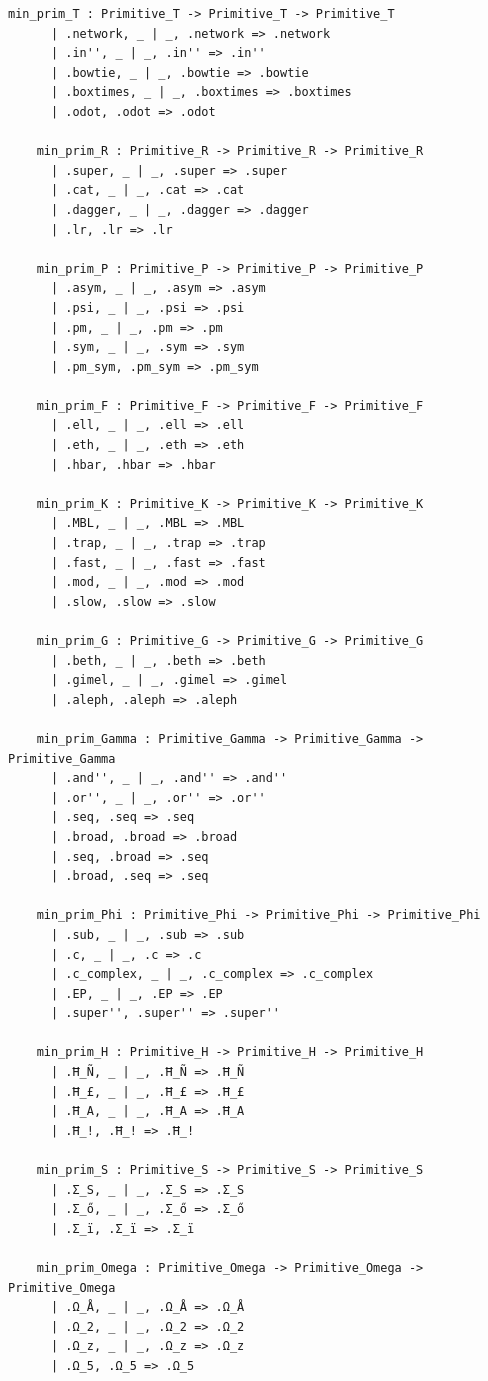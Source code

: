 \documentclass[12pt,a4paper]{article}
\begin{document}
\begin{lstlisting}[language=lean4]
    min_prim_T : Primitive_T -> Primitive_T -> Primitive_T
      | .network, _ | _, .network => .network
      | .in'', _ | _, .in'' => .in''
      | .bowtie, _ | _, .bowtie => .bowtie
      | .boxtimes, _ | _, .boxtimes => .boxtimes
      | .odot, .odot => .odot

    min_prim_R : Primitive_R -> Primitive_R -> Primitive_R
      | .super, _ | _, .super => .super
      | .cat, _ | _, .cat => .cat
      | .dagger, _ | _, .dagger => .dagger
      | .lr, .lr => .lr

    min_prim_P : Primitive_P -> Primitive_P -> Primitive_P
      | .asym, _ | _, .asym => .asym
      | .psi, _ | _, .psi => .psi
      | .pm, _ | _, .pm => .pm
      | .sym, _ | _, .sym => .sym
      | .pm_sym, .pm_sym => .pm_sym

    min_prim_F : Primitive_F -> Primitive_F -> Primitive_F
      | .ell, _ | _, .ell => .ell
      | .eth, _ | _, .eth => .eth
      | .hbar, .hbar => .hbar

    min_prim_K : Primitive_K -> Primitive_K -> Primitive_K
      | .MBL, _ | _, .MBL => .MBL
      | .trap, _ | _, .trap => .trap
      | .fast, _ | _, .fast => .fast
      | .mod, _ | _, .mod => .mod
      | .slow, .slow => .slow

    min_prim_G : Primitive_G -> Primitive_G -> Primitive_G
      | .beth, _ | _, .beth => .beth
      | .gimel, _ | _, .gimel => .gimel
      | .aleph, .aleph => .aleph

    min_prim_Gamma : Primitive_Gamma -> Primitive_Gamma -> Primitive_Gamma
      | .and'', _ | _, .and'' => .and''
      | .or'', _ | _, .or'' => .or''
      | .seq, .seq => .seq
      | .broad, .broad => .broad
      | .seq, .broad => .seq
      | .broad, .seq => .seq

    min_prim_Phi : Primitive_Phi -> Primitive_Phi -> Primitive_Phi
      | .sub, _ | _, .sub => .sub
      | .c, _ | _, .c => .c
      | .c_complex, _ | _, .c_complex => .c_complex
      | .EP, _ | _, .EP => .EP
      | .super'', .super'' => .super''

    min_prim_H : Primitive_H -> Primitive_H -> Primitive_H
      | .Ħ_Ñ, _ | _, .Ħ_Ñ => .Ħ_Ñ
      | .Ħ_£, _ | _, .Ħ_£ => .Ħ_£
      | .Ħ_A, _ | _, .Ħ_A => .Ħ_A
      | .Ħ_!, .Ħ_! => .Ħ_!

    min_prim_S : Primitive_S -> Primitive_S -> Primitive_S
      | .Σ_S, _ | _, .Σ_S => .Σ_S
      | .Σ_ő, _ | _, .Σ_ő => .Σ_ő
      | .Σ_ï, .Σ_ï => .Σ_ï

    min_prim_Omega : Primitive_Omega -> Primitive_Omega -> Primitive_Omega
      | .Ω_Å, _ | _, .Ω_Å => .Ω_Å
      | .Ω_2, _ | _, .Ω_2 => .Ω_2
      | .Ω_z, _ | _, .Ω_z => .Ω_z
      | .Ω_5, .Ω_5 => .Ω_5


\end{lstlisting}
\end{document}
